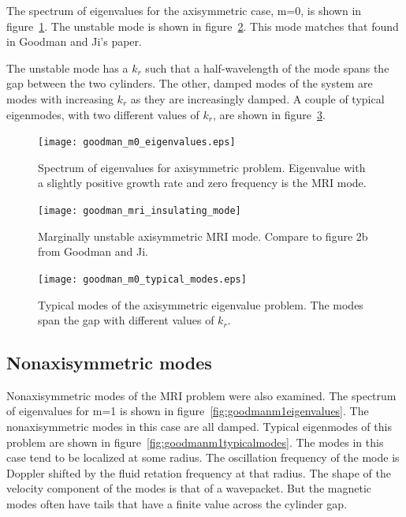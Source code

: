 \documentclass[letterpaper]{article}
\begin{document}
The spectrum of eigenvalues for the axisymmetric case, m=0, is shown
in figure~\ref{fig:goodmanm0eigenvalues}. The unstable mode is shown
in figure~\ref{fig:globalcode:goodman_mri_insulating_mode}. This mode
matches that found in Goodman and Ji's paper.

The unstable mode has a $k_r$ such that a half-wavelength of the mode
spans the gap between the two cylinders.  The other, damped modes of
the system are modes with increasing $k_r$ as they are increasingly
damped.  A couple of typical eigenmodes, with two different values of
$k_r$, are shown in figure~\ref{fig:goodmanm0typicalmodes}.

\begin{figure}
\begin{center}
\texttt{[image: goodman\_m0\_eigenvalues.eps]}
\caption{Spectrum of eigenvalues for axisymmetric problem.  Eigenvalue
  with a slightly positive growth rate and zero frequency is the MRI
  mode.}
\label{fig:goodmanm0eigenvalues}
\end{center}
\end{figure}


\begin{figure}
\begin{center}
\texttt{[image: goodman\_mri\_insulating\_mode]}
\caption[Marginally unstable axisymmetric MRI mode]{Marginally
  unstable axisymmetric MRI mode. Compare to figure 2{b} from Goodman
  and Ji.}
\label{fig:globalcode:goodman_mri_insulating_mode}
\end{center}
\end{figure}

\begin{figure}
\begin{center}
\texttt{[image: goodman\_m0\_typical\_modes.eps]}
\caption{Typical modes of the axisymmetric eigenvalue problem.  The
  modes span the gap with different values of $k_r$.}
\label{fig:goodmanm0typicalmodes}
\end{center}
\end{figure}

\subsection{Nonaxisymmetric modes}

Nonaxisymmetric modes of the MRI problem were also examined.  The
spectrum of eigenvalues for m=1 is shown in
figure~\ref{fig:goodmanm1eigenvalues}.  The nonaxisymmetric modes in
this case are all damped.  Typical eigenmodes of this problem are
shown in figure~\ref{fig:goodmanm1typicalmodes}.  The modes in this
case tend to be localized at some radius.  The oscillation frequency
of the mode is Doppler shifted by the fluid retation frequency at that
radius.  The shape of the velocity component of the modes is that of a
wavepacket.  But the magnetic modes often have tails that have a
finite value across the cylinder gap.
\end{document}
